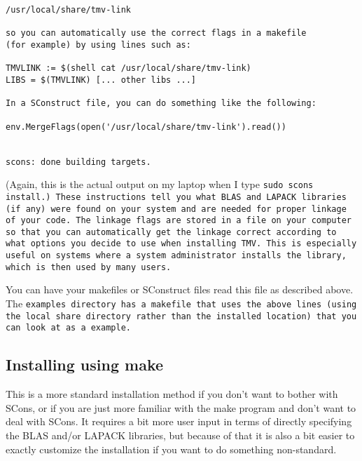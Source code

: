 \begin{enumerate}
\begin{verbatim}
/usr/local/share/tmv-link

so you can automatically use the correct flags in a makefile
(for example) by using lines such as:

TMVLINK := $(shell cat /usr/local/share/tmv-link)
LIBS = $(TMVLINK) [... other libs ...]

In a SConstruct file, you can do something like the following:

env.MergeFlags(open('/usr/local/share/tmv-link').read())


scons: done building targets.
\end{verbatim}
(Again, this is the actual output on my laptop when I type \tt{sudo scons install}.)
These instructions tell you what BLAS and LAPACK libraries (if any) were found on your system and 
are needed for proper linkage of your code.  The linkage flags are stored in a file on your
computer so that you can automatically get the linkage correct according to what options
you decide to use when installing TMV.  This is especially useful on systems where a
system administrator installs the library, which is then used by many users.  

You can have your makefiles or SConstruct files read this file as described above.
The \tt{examples} directory has a makefile that uses the above lines
(using the local \tt{share} directory rather than the installed location)
that you can look at as a example.

\end{enumerate}

\subsection{Installing using make}
\label{Install_Make}
This is a more standard installation method if you don't want to bother with SCons, or if you are just
more familiar with the make program and don't want to deal with SCons.  It requires a bit more
user input in terms of directly specifying the BLAS and/or LAPACK libraries, but because of that
it is also a bit easier to exactly customize the installation if you want to do something non-standard.

